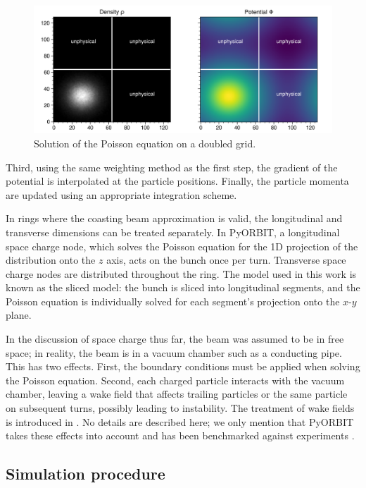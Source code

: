 \begin{figure}[!p]
    \centering
    \includegraphics[width=\textwidth]{Images/chapter3/poisson.png}
    \caption{\label{fig:poisson}Solution of the Poisson equation on a doubled grid.}
\end{figure}
%
Third, using the same weighting method as the first step, the gradient of the potential is interpolated at the particle positions. Finally, the particle momenta are updated using an appropriate integration scheme.

In rings where the coasting beam approximation is valid, the longitudinal and transverse dimensions can be treated separately. In PyORBIT, a longitudinal space charge node, which solves the Poisson equation for the 1D projection of the distribution onto the $z$ axis, acts on the bunch once per turn. Transverse space charge nodes are distributed throughout the ring. The model used in this work is known as the sliced model: the bunch is sliced into longitudinal segments, and the Poisson equation is individually solved for each segment's projection onto the $x$-$y$ plane.

In the discussion of space charge thus far, the beam was assumed to be in free space; in reality, the beam is in a vacuum chamber such as a conducting pipe. This has two effects. First, the boundary conditions must be applied when solving the Poisson equation. Second, each charged particle interacts with the vacuum chamber, leaving a wake field that affects trailing particles or the same particle on subsequent turns, possibly leading to instability. The treatment of wake fields is introduced in \cite{Chao1993}. No details are described here; we only mention that PyORBIT takes these effects into account and has been benchmarked against experiments \cite{Holmes2011}.






\subsection{Simulation procedure}

